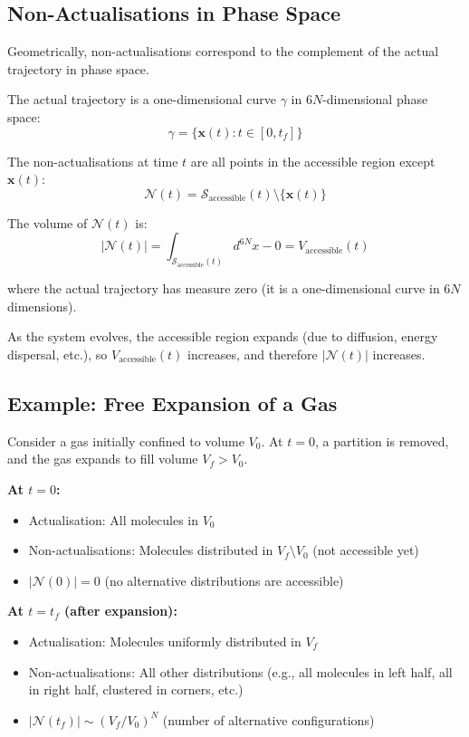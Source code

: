 \documentclass[twocolumn,10pt]{article}
\theoremstyle{definition}
\theoremstyle{remark}
\begin{document}
\subsection{Non-Actualisations in Phase Space}

Geometrically, non-actualisations correspond to the complement of the actual trajectory in phase space.

The actual trajectory is a one-dimensional curve $\gamma$ in $6N$-dimensional phase space:
$$
\gamma = \{\mathbf{x}(t) : t \in [0, t_f]\}
$$

The non-actualisations at time $t$ are all points in the accessible region except $\mathbf{x}(t)$:
$$
\mathcal{N}(t) = \mathcal{S}_{\text{accessible}}(t) \setminus \{\mathbf{x}(t)\}
$$

The volume of $\mathcal{N}(t)$ is:
$$
|\mathcal{N}(t)| = \int_{\mathcal{S}_{\text{accessible}}(t)} d^{6N}x - 0 = V_{\text{accessible}}(t)
$$

where the actual trajectory has measure zero (it is a one-dimensional curve in $6N$ dimensions).

As the system evolves, the accessible region expands (due to diffusion, energy dispersal, etc.), so $V_{\text{accessible}}(t)$ increases, and therefore $|\mathcal{N}(t)|$ increases.

\subsection{Example: Free Expansion of a Gas}

Consider a gas initially confined to volume $V_0$. At $t = 0$, a partition is removed, and the gas expands to fill volume $V_f > V_0$.

\textbf{At $t = 0$:}
\begin{itemize}
\item Actualisation: All molecules in $V_0$
\item Non-actualisations: Molecules distributed in $V_f \setminus V_0$ (not accessible yet)
\item $|\mathcal{N}(0)| = 0$ (no alternative distributions are accessible)
\end{itemize}

\textbf{At $t = t_f$ (after expansion):}
\begin{itemize}
\item Actualisation: Molecules uniformly distributed in $V_f$
\item Non-actualisations: All other distributions (e.g., all molecules in left half, all in right half, clustered in corners, etc.)
\item $|\mathcal{N}(t_f)| \sim (V_f / V_0)^N$ (number of alternative configurations)
\end{itemize}
\end{document}
